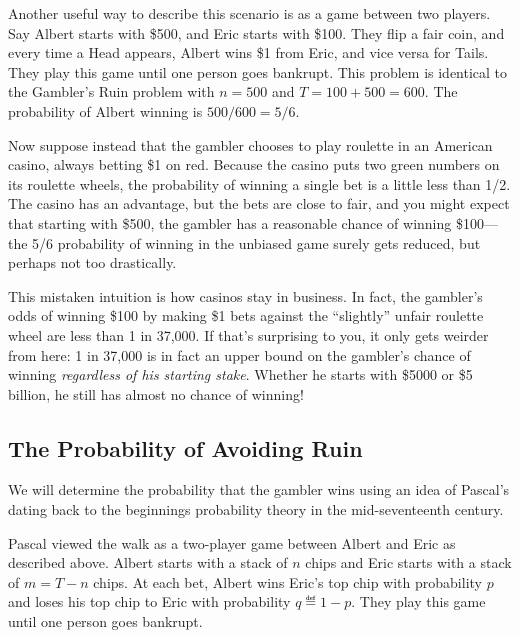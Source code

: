 Another useful way to describe this scenario is as a game between two
players.  Say Albert starts with \$500, and Eric starts with \$100.
They flip a fair coin, and every time a Head appears, Albert wins \$1
from Eric, and vice versa for Tails.  They play this game until one
person goes bankrupt.  This problem is identical to the Gambler's Ruin
problem with $n=500$ and $T=100+500=600$.  The probability of Albert
winning is $500/600 = 5/6$.\iffalse , namely, the ratio of his wealth
to the combined wealth.  Eric's chance of winning is $1/6$.\fi


Now suppose instead that the gambler chooses to play roulette in an
American casino, always betting \$1 on red.  Because the casino puts
two green numbers on its roulette wheels, the probability of winning a
single bet is \iffalse 18/38, which is just\fi a little less than 1/2.
The casino has an advantage, but the bets are close to fair, and you
might expect that starting with \$500, the gambler has a reasonable
chance of winning \$100---the 5/6 probability of winning in the
unbiased game surely gets reduced, but perhaps not too drastically.

This mistaken intuition is how casinos stay in business.  In fact, the
gambler's odds of winning \$100 by making \$1 bets against the
``slightly'' unfair roulette wheel are less than 1 in 37,000.  If that's
surprising to you, it only gets weirder from here: 1 in 37,000 is in
fact an upper bound on the gambler's chance of winning
\emph{regardless of his starting stake}.  Whether he starts with
\$5000 or \$5 billion, he still has almost no chance of winning!

\subsection{The Probability of Avoiding Ruin}\label{prwinwalk_subsec}

We will determine the probability that the gambler wins using an idea
of Pascal's dating back to the beginnings probability theory in the
mid-seventeenth century.

Pascal viewed the walk as a two-player game between Albert and Eric as
described above.  Albert starts with a stack of $n$ chips and Eric
starts with a stack of $m = T-n$ chips.  At each bet, Albert wins
Eric's top chip with probability $p$ and loses his top chip to Eric
with probability $q \eqdef 1-p$.  They play this game until one
person goes bankrupt.

